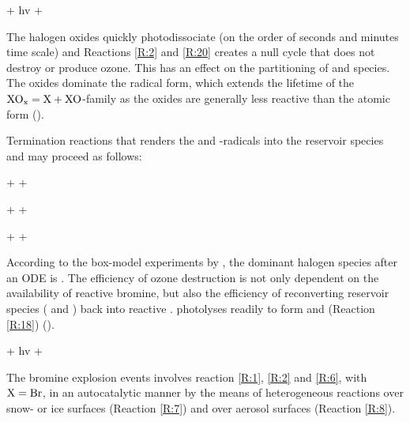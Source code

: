 \begin{reaction}
     + hv \rightarrow {} + 
    \label{R:20}
\end{reaction}

The halogen oxides quickly photodissociate (on the order of seconds and minutes time scale) and Reactions \ref{R:2} and \ref{R:20} creates a null cycle that does not destroy or produce ozone. This has an effect on the partitioning of  and  species. The oxides dominate the radical form, which extends the lifetime of the $\mathrm{XO_x} = \mathrm{X} + \mathrm{XO}$-family as the oxides are generally less reactive than the atomic form (\cite{Simpson2015}). 


\medskip

Termination reactions that renders the  and -radicals into the reservoir species  and  may proceed as follows: 


\begin{reaction}
     +  \rightarrow {} + 
    \label{R:6} 
\end{reaction}

\begin{reaction}
     +  \rightarrow {} + 
    \label{R:17}
\end{reaction}


\begin{reaction}
     +  \rightarrow {} + 
    \label{R:16}
\end{reaction}


According to the box-model experiments by \cite{CAO}, the dominant halogen species after an ODE is . The efficiency of ozone destruction is not only dependent on the availability of reactive bromine, but also the efficiency of reconverting reservoir species ( and ) back into reactive .  photolyses readily to form  and  (Reaction \ref{R:18}) (\cite{Hausmann1994}).

\begin{reaction}
     + hv \rightarrow {} + 
    \label{R:18}
\end{reaction}


The bromine explosion events involves reaction \ref{R:1}, \ref{R:2} and \ref{R:6}, with $\mathrm{X} = \mathrm{Br}$, in an autocatalytic manner by the means of heterogeneous reactions over snow- or ice surfaces (Reaction \ref{R:7}) and over aerosol surfaces (Reaction \ref{R:8}). 

